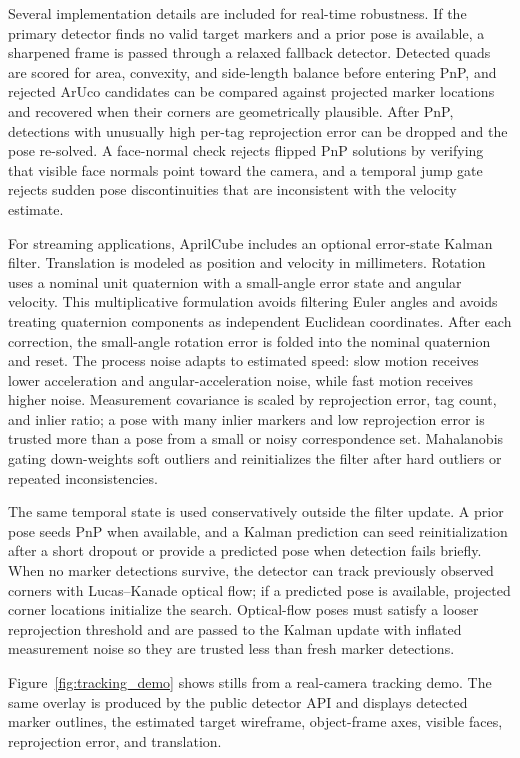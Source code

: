 \documentclass[conference]{IEEEtran}
\begin{document}
Several implementation details are included for real-time robustness. If the primary detector finds no valid target markers and a prior pose is available, a sharpened frame is passed through a relaxed fallback detector. Detected quads are scored for area, convexity, and side-length balance before entering PnP, and rejected ArUco candidates can be compared against projected marker locations and recovered when their corners are geometrically plausible. After PnP, detections with unusually high per-tag reprojection error can be dropped and the pose re-solved. A face-normal check rejects flipped PnP solutions by verifying that visible face normals point toward the camera, and a temporal jump gate rejects sudden pose discontinuities that are inconsistent with the velocity estimate.

For streaming applications, AprilCube includes an optional error-state Kalman filter. Translation is modeled as position and velocity in millimeters. Rotation uses a nominal unit quaternion with a small-angle error state and angular velocity. This multiplicative formulation avoids filtering Euler angles and avoids treating quaternion components as independent Euclidean coordinates. After each correction, the small-angle rotation error is folded into the nominal quaternion and reset. The process noise adapts to estimated speed: slow motion receives lower acceleration and angular-acceleration noise, while fast motion receives higher noise. Measurement covariance is scaled by reprojection error, tag count, and inlier ratio; a pose with many inlier markers and low reprojection error is trusted more than a pose from a small or noisy correspondence set. Mahalanobis gating down-weights soft outliers and reinitializes the filter after hard outliers or repeated inconsistencies.

The same temporal state is used conservatively outside the filter update. A prior pose seeds PnP when available, and a Kalman prediction can seed reinitialization after a short dropout or provide a predicted pose when detection fails briefly. When no marker detections survive, the detector can track previously observed corners with Lucas--Kanade optical flow; if a predicted pose is available, projected corner locations initialize the search. Optical-flow poses must satisfy a looser reprojection threshold and are passed to the Kalman update with inflated measurement noise so they are trusted less than fresh marker detections.

Figure~\ref{fig:tracking_demo} shows stills from a real-camera tracking demo. The same overlay is produced by the public detector API and displays detected marker outlines, the estimated target wireframe, object-frame axes, visible faces, reprojection error, and translation.
\end{document}
